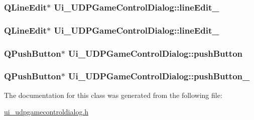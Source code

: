 \hypertarget{class_ui___u_d_p_game_control_dialog_a006400fb1c5e865a0281b2b30f217cbf}{
\subsubsection[{line\-Edit\-\_\-3}]{\setlength{\rightskip}{0pt plus 5cm}Q\-Line\-Edit$\ast$ Ui\-\_\-\-U\-D\-P\-Game\-Control\-Dialog\-::line\-Edit\-\_}}\label{class_ui___u_d_p_game_control_dialog_a006400fb1c5e865a0281b2b30f217cbf}
\hypertarget{class_ui___u_d_p_game_control_dialog_a9588273b378778aefb012e49ba0e3aeb}{
\subsubsection[{line\-Edit\-\_\-4}]{\setlength{\rightskip}{0pt plus 5cm}Q\-Line\-Edit$\ast$ Ui\-\_\-\-U\-D\-P\-Game\-Control\-Dialog\-::line\-Edit\-\_}}\label{class_ui___u_d_p_game_control_dialog_a9588273b378778aefb012e49ba0e3aeb}
\hypertarget{class_ui___u_d_p_game_control_dialog_a2ec4d3ca8339f78ad4d8c60d74d27c74}{
\subsubsection[{push\-Button}]{\setlength{\rightskip}{0pt plus 5cm}Q\-Push\-Button$\ast$ Ui\-\_\-\-U\-D\-P\-Game\-Control\-Dialog\-::push\-Button}}\label{class_ui___u_d_p_game_control_dialog_a2ec4d3ca8339f78ad4d8c60d74d27c74}
\hypertarget{class_ui___u_d_p_game_control_dialog_a0a06184a877f5fae1cf94c074add1c5b}{
\subsubsection[{push\-Button\-\_\-2}]{\setlength{\rightskip}{0pt plus 5cm}Q\-Push\-Button$\ast$ Ui\-\_\-\-U\-D\-P\-Game\-Control\-Dialog\-::push\-Button\-\_}}\label{class_ui___u_d_p_game_control_dialog_a0a06184a877f5fae1cf94c074add1c5b}


The documentation for this class was generated from the following file\-:\begin{DoxyCompactItemize}
\item 
\hyperlink{ui__udpgamecontroldialog_8h}{ui\-\_\-udpgamecontroldialog.\-h}\end{DoxyCompactItemize}
